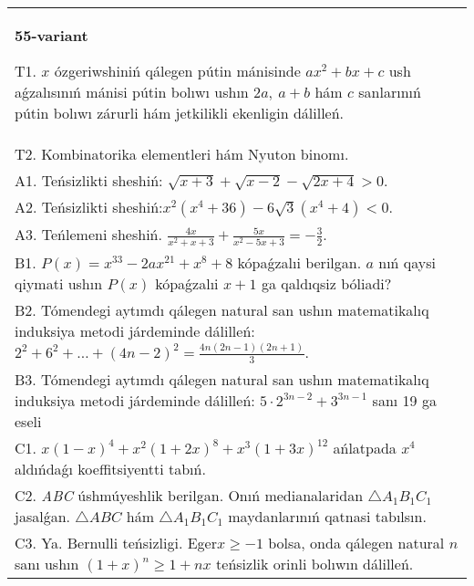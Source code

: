 \documentclass{article}
\begin{document}
\begin{tabular}{m{17cm}}
\textbf{55-variant}
\newline

T1. \(x\) ózgeriwshiniń qálegen pútin mánisinde \(ax^{2} + bx + c\) ush aǵzalısınıń mánisi pútin bolıwı ushın \(2a,\ a + b\) hám \(c\) sanlarınıń pútin bolıwı zárurli hám jetkilikli ekenligin dálilleń. \\
T2. Kombinatorika elementleri hám Nyuton binomı. \\
A1. Teńsizlikti sheshiń: \(\sqrt{x + 3} + \sqrt{x - 2} - \sqrt{2x + 4} > 0\). \\
A2. Teńsizlikti sheshiń:\(x^{2}\left( x^{4} + 36 \right) - 6\sqrt{3}\left( x^{4} + 4 \right) < 0\). \\
A3. Teńlemeni sheshiń. \(\frac{4x}{x^{2} + x + 3} + \frac{5x}{x^{2} - 5x + 3} = - \frac{3}{2}\). \\
B1. \(P(x) = x^{33} - 2ax^{21} + x^{8} + 8\) kópaǵzalıi berilgan. \(a\) nıń qaysi qiymati ushın \(P(x)\) kópaǵzalıi \(x + 1\) ga qaldıqsiz bóliadi? \\
B2. Tómendegi aytımdı qálegen natural san ushın matematikalıq induksiya metodi járdeminde dálilleń: \(2^{2} + 6^{2} + \ldots + (4n - 2)^{2} = \frac{4n(2n - 1)(2n + 1)}{3}\). \\
B3. Tómendegi aytımdı qálegen natural san ushın matematikalıq induksiya metodi járdeminde dálilleń: \(5 \cdot 2^{3n - 2} + 3^{3n - 1}\) sanı 19 ga eseli \\
C1. \(x(1 - x)^{4} + x^{2}(1 + 2x)^{8} + x^{3}(1 + 3x)^{12}\) ańlatpada \(x^{4}\) aldıńdaǵı koeffitsiyentti tabıń. \\
C2. \emph{ABC} úshmúyeshlik berilgan. Onıń medianalaridan \(\bigtriangleup A_{1}B_{1}C_{1}\) jasalǵan. \(\bigtriangleup ABC\) hám \(\bigtriangleup A_{1}B_{1}C_{1}\) maydanlarınıń qatnasi tabılsın. \\
C3. Ya. Bernulli teńsizligi. Eger\(x \geq - 1\) bolsa, onda qálegen natural \(n\) sanı ushın \((1 + x)^{n} \geq 1 + nx\) teńsizlik orinli bolıwın dálilleń. \\

\end{tabular}
\vspace{1cm}
\end{document}
